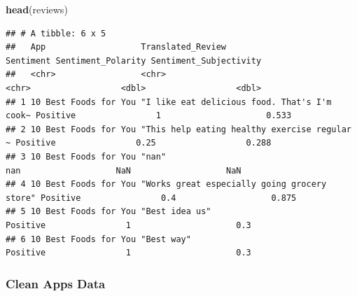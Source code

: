 \documentclass[
]{article}
\newenvironment{Shaded}{\begin{snugshade}}{\end{snugshade}}
\newcommand{\FunctionTok}[1]{\textcolor[rgb]{0.13,0.29,0.53}{\textbf{#1}}}
\newcommand{\NormalTok}[1]{#1}
\begin{document}
\begin{Shaded}
\begin{Highlighting}[]
\FunctionTok{head}\NormalTok{(reviews)}
\end{Highlighting}
\end{Shaded}

\begin{verbatim}
## # A tibble: 6 x 5
##   App                   Translated_Review                            Sentiment Sentiment_Polarity Sentiment_Subjectivity
##   <chr>                 <chr>                                        <chr>                  <dbl>                  <dbl>
## 1 10 Best Foods for You "I like eat delicious food. That's I'm cook~ Positive                1                     0.533
## 2 10 Best Foods for You "This help eating healthy exercise regular ~ Positive                0.25                  0.288
## 3 10 Best Foods for You "nan"                                        nan                   NaN                   NaN    
## 4 10 Best Foods for You "Works great especially going grocery store" Positive                0.4                   0.875
## 5 10 Best Foods for You "Best idea us"                               Positive                1                     0.3  
## 6 10 Best Foods for You "Best way"                                   Positive                1                     0.3
\end{verbatim}

\subsubsection{Clean Apps Data}\label{clean-apps-data}
\end{document}
